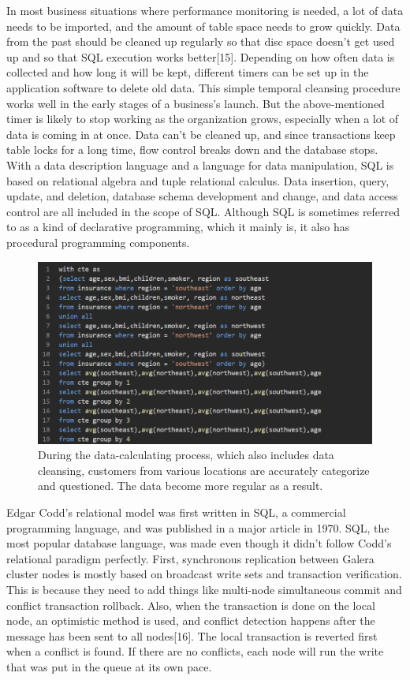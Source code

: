 \documentclass[journal]{IEEEtran}
\begin{document}
 
 \par In most business situations where performance monitoring is needed, a lot of data needs to be imported, and the amount of table space needs to grow quickly. Data from the past should be cleaned up regularly so that disc space doesn't get used up and so that SQL execution works better[15]. Depending on how often data is collected and how long it will be kept, different timers can be set up in the application software to delete old data. This simple temporal cleansing procedure works well in the early stages of a business's launch. But the above-mentioned timer is likely to stop working as the organization grows, especially when a lot of data is coming in at once. Data can't be cleaned up, and since transactions keep table locks for a long time, flow control breaks down and the database stops. With a data description language and a language for data manipulation, SQL is based on relational algebra and tuple relational calculus. Data insertion, query, update, and deletion, database schema development and change, and data access control are all included in the scope of SQL. Although SQL is sometimes referred to as a kind of declarative programming, which it mainly is, it also has procedural programming components.

 \begin{figure}[h]
  \centering
  \includegraphics [width= 3.55 in]{sql.png}
\caption{During the data-calculating process, which also includes data cleansing, customers from various locations are accurately categorize and questioned. The data become more regular as a result.}
  \label{storage}
\end{figure}

Edgar Codd's relational model was first written in SQL, a commercial programming language, and was published in a major article in 1970. SQL, the most popular database language, was made even though it didn't follow Codd's relational paradigm perfectly. First, synchronous replication between Galera cluster nodes is mostly based on broadcast write sets and transaction verification. This is because they need to add things like multi-node simultaneous commit and conflict transaction rollback. Also, when the transaction is done on the local node, an optimistic method is used, and conflict detection happens after the message has been sent to all nodes[16]. The local transaction is reverted first when a conflict is found. If there are no conflicts, each node will run the write that was put in the queue at its own pace.
\end{document}
